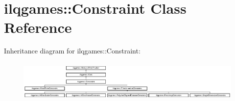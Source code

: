 \hypertarget{classilqgames_1_1_constraint}{}\section{ilqgames\+:\+:Constraint Class Reference}
\label{classilqgames_1_1_constraint}
Inheritance diagram for ilqgames\+:\+:Constraint\+:\begin{figure}[H]
\begin{center}
\leavevmode
\includegraphics[height=2.066421cm]{classilqgames_1_1_constraint}
\end{center}
\end{figure}

